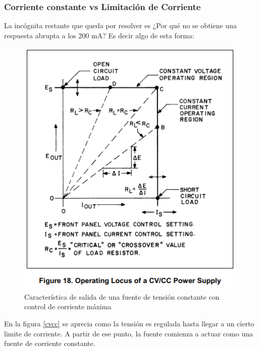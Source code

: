 \subsubsection{Corriente constante vs Limitación de Corriente}
La incógnita restante que queda por resolver es ¿Por qué no se obtiene una respuesta abrupta a los 200 mA?
Es decir algo de esta forma:
\begin{figure}[H]
	\centering
	\includegraphics[scale=0.7]{ImagenesEjercicio1/CVCC}
	\caption{Característica de salida de una fuente de tensión constante con control de corriente máxima}
	\label{fig:cvcc}
\end{figure}
En la figura \ref{cvcc} se aprecia como la tensión es regulada hasta llegar a un cierto limite de corriente. A partir de ese punto, la fuente comienza a actuar como una fuente de corriente constante.

